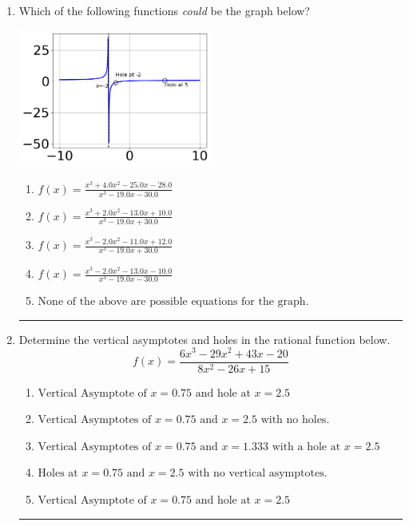 \documentclass[14pt]{extbook}
\newcommand{\litem}[1]{\item#1\hspace*{-1cm}\rule{\textwidth}{0.4pt}}
\begin{document}
\begin{enumerate}
{\begin{enumerate}[label=\Alph*.]
\end{enumerate} }
\litem{
Which of the following functions \textit{could} be the graph below?
\begin{center}
    \includegraphics[width=0.5\textwidth]{../Figures/identifyGraphOfRationalFunctionA.png}
\end{center}
\begin{enumerate}[label=\Alph*.]
\item \( f(x)=\frac{x^{3} +4.0 x^{2} -25.0 x -28.0}{x^{3} -19.0 x -30.0} \)
\item \( f(x)=\frac{x^{3} +2.0 x^{2} -13.0 x + 10.0}{x^{3} -19.0 x + 30.0} \)
\item \( f(x)=\frac{x^{3} -2.0 x^{2} -11.0 x + 12.0}{x^{3} -19.0 x + 30.0} \)
\item \( f(x)=\frac{x^{3} -2.0 x^{2} -13.0 x -10.0}{x^{3} -19.0 x -30.0} \)
\item \( \text{None of the above are possible equations for the graph.} \)

\end{enumerate} }
\litem{
Determine the vertical asymptotes and holes in the rational function below.\[ f(x) = \frac{6x^{3} -29 x^{2} +43 x -20}{8x^{2} -26 x + 15} \]\begin{enumerate}[label=\Alph*.]
\item \( \text{Vertical Asymptote of } x = 0.75 \text{ and hole at } x = 2.5 \)
\item \( \text{Vertical Asymptotes of } x = 0.75 \text{ and } x = 2.5 \text{ with no holes.} \)
\item \( \text{Vertical Asymptotes of } x = 0.75 \text{ and } x = 1.333 \text{ with a hole at } x = 2.5 \)
\item \( \text{Holes at } x = 0.75 \text{ and } x = 2.5 \text{ with no vertical asymptotes.} \)
\item \( \text{Vertical Asymptote of } x = 0.75 \text{ and hole at } x = 2.5 \)


\end{enumerate}}
\end{enumerate}
\end{document}
